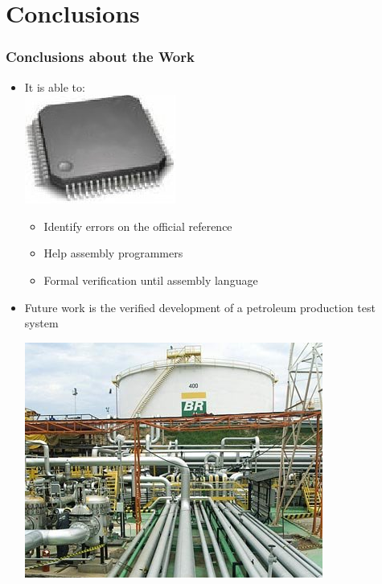 \section{Conclusions}





 \begin{frame}
 \frametitle{Conclusions about the Work}
    
 \begin{itemize}
   \item It is able to: \ \ \ \ \ \ \ \ \ \ \ \ \ \ \ \ \ \ \ \ \ \ \ \ \ \ \ \ \ \ \ 
    \includegraphics[width=.2\textwidth]{figures/processador_generico.jpg}
 	\begin{itemize} 
 	  \item Identify  errors on the official reference
 	  \item Help assembly programmers
 	  \item Formal verification until assembly language 
     \end{itemize} 
     \item Future work is the verified development of a petroleum production test system\\ 
     \begin{center}   
 	   \includegraphics[height=.25\textheight]{figures/dutos.png}
	 \end{center}%
     
 \end{itemize} 
  	
 \end{frame}


